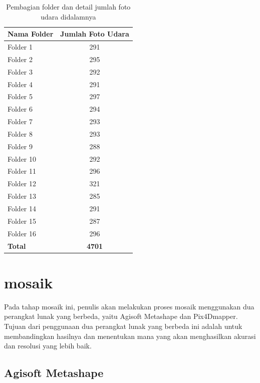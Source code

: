 \begin{table} [H]
\centering
\caption{Pembagian folder dan detail jumlah foto udara didalamnya}
\begin{tabular}{|l|c|}
\hline
\textbf{Nama Folder} & \textbf{Jumlah Foto Udara} \\ \hline
Folder 1 & 291 \\ \hline
Folder 2 & 295 \\ \hline
Folder 3 & 292 \\ \hline
Folder 4 & 291 \\ \hline
Folder 5 & 297 \\ \hline
Folder 6 & 294 \\ \hline
Folder 7 & 293 \\ \hline
Folder 8 & 293 \\ \hline
Folder 9 & 288 \\ \hline
Folder 10 & 292 \\ \hline
Folder 11 & 296 \\ \hline
Folder 12 & 321 \\ \hline
Folder 13 & 285 \\ \hline
Folder 14 & 291 \\ \hline
Folder 15 & 287 \\ \hline
Folder 16 & 296 \\ \hline
\textbf{Total} & \textbf{4701} \\ \hline
\end{tabular}
\label{tab:folder}
\end{table}

\section{mosaik}

\par Pada tahap mosaik ini, penulis akan melakukan proses mosaik menggunakan dua perangkat lunak yang berbeda, yaitu Agisoft Metashape dan Pix4Dmapper. Tujuan dari penggunaan dua perangkat lunak yang berbeda ini adalah untuk membandingkan hasilnya dan menentukan mana yang akan menghasilkan akurasi dan resolusi yang lebih baik.

\subsection{Agisoft Metashape}

